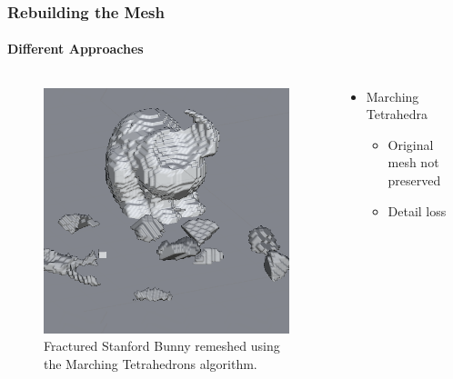 \documentclass{beamer}
\begin{document}
	\begin{frame}
	\frametitle{Rebuilding the Mesh}
	\framesubtitle{Different Approaches}
		\begin{columns}[T] %
			\begin{column}[T]{5cm} %
				\begin{figure}
					\centerline{\includegraphics[scale=0.4]{Marching.png}}
					\caption{Fractured Stanford Bunny remeshed using the Marching Tetrahedrons algorithm.}
				\end{figure}
			\end{column}
			\begin{column}[T]{5cm} %
				\begin{itemize}
				\item{Marching Tetrahedra}
					\begin{itemize}
						\item{Original mesh not preserved}
						\item{Detail loss}
					\end{itemize}
				\end{itemize}
			\end{column}
		\end{columns}
	\end{frame}
\end{document}
